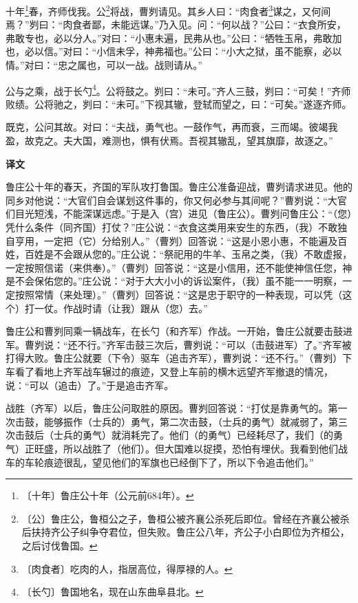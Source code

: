 \documentclass[12pt,UTF-8,openany,a4]{ctexbook}
\begin{document}
\begin{large}
    
    十年\footnote{〔十年〕\yiwen 鲁庄公十年（公元前684年）。}春，齐师伐我。公\footnote{〔公〕\yiwen \yiwen 鲁庄公，鲁桓公之子，鲁桓公被齐襄公杀死后即位。曾经在齐襄公被杀后扶持齐公子纠争夺君位，但失败。鲁庄公八年，齐公子小白即位为齐桓公，之后讨伐鲁国。}将战，曹刿请见。其乡人曰：“肉食者\footnote{〔肉食者〕\yiwen 吃肉的人，指居高位，得厚禄的人。}谋之，又何间焉？”刿曰：“肉食者鄙，未能远谋。”乃入见。问：“何以战？”公曰：“衣食所安，弗敢专也，必以分人。”对曰：“小惠未遍，民弗从也。”公曰：“牺牲玉帛，弗敢加也，必以信。”对曰：“小信未孚，神弗福也。”公曰：“小大之狱，虽不能察，必以情。”对曰：“忠之属也，可以一战。战则请从。”
    
    公与之乘，战于长勺\footnote{〔长勺〕\yiwen 鲁国地名，现在山东曲阜县北。}。公将鼓之。刿曰：“未可。”齐人三鼓，刿曰：“可矣！”齐师败绩。公将驰之，刿曰：“未可。”下视其辙，登轼而望之，曰：“可矣。”遂逐齐师。
    
    既克，公问其故。对曰：“夫战，勇气也。一鼓作气，再而衰，三而竭。彼竭我盈，故克之。夫大国，难测也，惧有伏焉。吾视其辙乱，望其旗靡，故逐之。”
\end{large}


\newpage

\begin{Large}
    \noindent\textbf{译文}
\end{Large}


\vspace{1em}

\begin{large}
    \yiwen 
    鲁庄公十年的春天，齐国的军队攻打鲁国。鲁庄公准备迎战，曹刿请求进见。他的同乡对他说：“大官们自会谋划这件事的，你又何必参与其间呢？”曹刿说：“大官们目光短浅，不能深谋远虑。”于是入（宫）进见（鲁庄公）。曹刿问鲁庄公：“（您）凭什么条件（同齐国）打仗？”庄公说：“衣食这类用来安生的东西，（我）不敢独自亨用，一定把（它）分给别人。”（曹刿）回答说：“这是小恩小惠，不能遍及百姓，百姓是不会跟从您的。”庄公说：“祭祀用的牛羊、玉帛之类，（我）不敢虚报，一定按照信诺（来供奉）。”（曹刿）回答说：“这是小信用，还不能使神信任您，神是不会保佑您的。”庄公说：“对于大大小小的诉讼案件，（我）虽不能一一明察，一定按照常情（来处理）。”（曹刿）回答说：“这是忠于职守的一种表现，可以凭（这个）打一仗。作战时请（让我）跟从（您）去。”
    
    鲁庄公和曹刿同乘一辆战车，在长勺（和齐军）作战。一开始，鲁庄公就要击鼓进军。曹刿说：“还不行。”齐军击鼓三次后，曹刿说：“可以（击鼓进军）了。”齐军被打得大败。鲁庄公就要（下令）驱车（追击齐军），曹刿说：“还不行。”（曹刿）下车看了看地上齐军战车辗过的痕迹，又登上车前的横木远望齐军撤退的情况，说：“可以（追击）了。”于是追击齐军。
    
    战胜（齐军）以后，鲁庄公问取胜的原因。曹刿回答说：“打仗是靠勇气的。第一次击鼓，能够振作（士兵的）勇气，第二次击鼓，（士兵的勇气）就减弱了，第三次击鼓后（士兵的勇气）就消耗完了。他们（的勇气）已经耗尽了，我们（的勇气）正旺盛，所以战胜了（他们）。但大国难以捉摸，恐怕有埋伏。我看到他们战车的车轮痕迹很乱，望见他们的军旗也已经倒下了，所以下令追击他们。”
    
\end{large}
\end{document}
